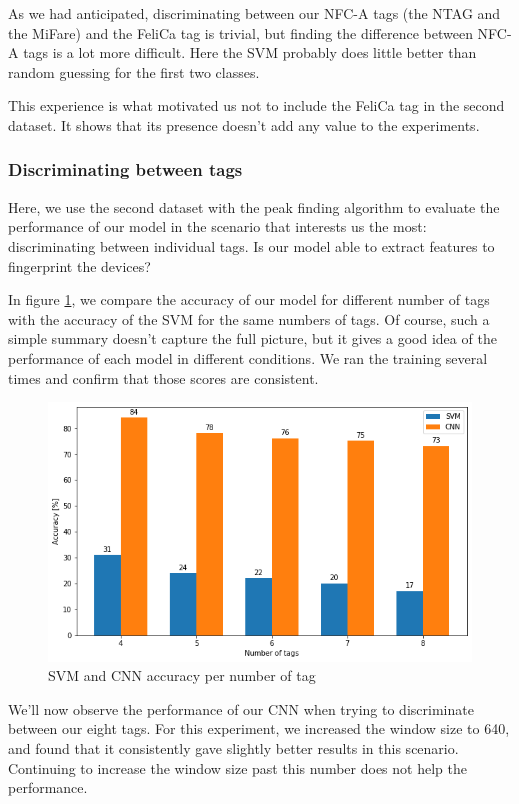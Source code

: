 As we had anticipated, discriminating between our NFC-A tags (the NTAG and the MiFare) and the FeliCa tag is trivial, but finding the difference between NFC-A tags is a lot more difficult. Here the SVM probably does little better than random guessing for the first two classes.

This experience is what motivated us not to include the FeliCa tag in the second dataset. It shows that its presence doesn't add any value to the experiments.

\subsubsection{Discriminating between tags}

Here, we use the second dataset with the peak finding algorithm to evaluate the performance of our model in the scenario that interests us the most: discriminating between individual tags. Is our model able to extract features to fingerprint the devices?

In figure \ref{fig:svmcnn}, we compare the accuracy of our model for different number of tags with the accuracy of the SVM for the same numbers of tags. Of course, such a simple summary doesn't capture the full picture, but it gives a good idea of the performance of each model in different conditions. We ran the training several times and confirm that those scores are consistent.

\begin{figure}[htbp!]
  \centering
  \includegraphics[scale=0.65]{figures/ml_svmcnn.png}
  \caption{SVM and CNN accuracy per number of tag}
  \label{fig:svmcnn}
\end{figure}

We'll now observe the performance of our CNN when trying to discriminate between our eight tags. For this experiment, we increased the window size to 640, and found that it consistently gave slightly better results in this scenario. Continuing to increase the window size past this number does not help the performance.

